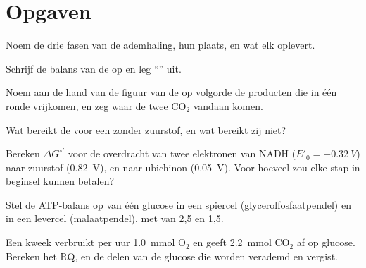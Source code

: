 \section{Opgaven}

\begin{exercise}[$\star$]\label{exo:b1:respiration-fermentation:1}
Noem de drie fasen van de ademhaling, hun plaats, en wat elk oplevert.
\end{exercise}

\begin{exercise}[$\star$]\label{exo:b1:respiration-fermentation:2}
Schrijf de balans van de  op en leg ``'' uit.
\end{exercise}

\begin{exercise}[$\star$]\label{exo:b1:respiration-fermentation:3}
Noem aan de hand van de figuur van de  op volgorde de producten die in
één ronde vrijkomen, en zeg waar de twee $\mathrm{CO_2}$ vandaan komen.
\end{exercise}

\begin{exercise}[$\star$]\label{exo:b1:respiration-fermentation:4}
Wat bereikt de  voor een  zonder zuurstof, en wat bereikt zij niet?
\end{exercise}

\begin{exercise}[$\star\star$]\label{exo:b1:respiration-fermentation:5}
Bereken $\Delta G^{\circ\prime}$ voor de overdracht van twee elektronen van NADH
($E'_0 = \qty{-0.32}{V}$) naar zuurstof (\qty{+0.82}{V}), en naar ubichinon
(\qty{+0.05}{V}). Voor hoeveel  zou elke stap in beginsel kunnen betalen?
\end{exercise}

\begin{exercise}[$\star\star$]\label{exo:b1:respiration-fermentation:6}
Stel de ATP-balans op van één glucose in een spiercel (glycerolfosfaatpendel) en in
een levercel (malaatpendel), met  van 2,5 en 1,5.
\end{exercise}

\begin{exercise}[$\star\star$]\label{exo:b1:respiration-fermentation:7}
Een kweek verbruikt per uur \qty{1.0}{mmol} $\mathrm{O_2}$ en geeft
\qty{2.2}{mmol} $\mathrm{CO_2}$ af op glucose. Bereken het RQ, en de delen van de
glucose die worden verademd en vergist.
\end{exercise}

